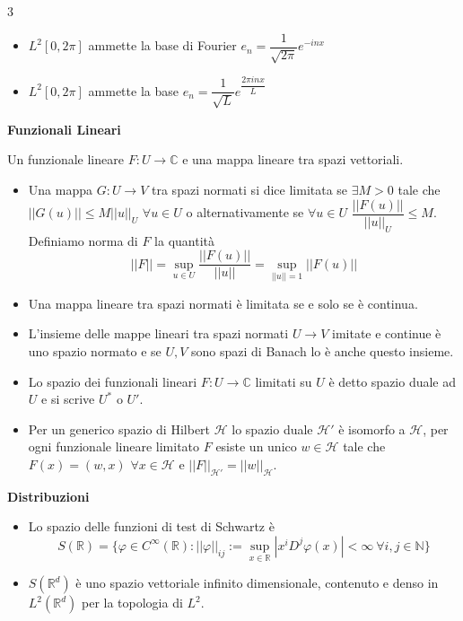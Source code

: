 \documentclass[10pt,a4paper]{report}
\begin{document}
\begin{multicols*}{3}
\begin{center}
\begin{itemize}[label=$\cdot$]
		\begin{itemize}
			\item $L^2[0,2\pi]$ ammette la base di Fourier $e_n=\dfrac{1}{\sqrt{2\pi}}e^{-inx}$
			\item $L^2[0,2\pi]$ ammette la base $e_n=\dfrac{1}{\sqrt{L}}e^{\dfrac{2\pi inx}{L}}$
		\end{itemize}
	\end{itemize}
\par
\textbf{Funzionali Lineari} \par
Un funzionale lineare $F:U\rightarrow \mathbb{C}$ e una mappa lineare tra spazi vettoriali. \par
	\begin{itemize}[label=$\cdot$]
		\item Una mappa $G:U\rightarrow V$ tra spazi normati si dice limitata se $\exists M>0$ tale che $||G(u)||\leq M ||u||_U$ $\forall u\in U$ o alternativamente se $\forall u\in U$ $\dfrac{||F(u)||}{||u||_U}\leq M$.\\ Definiamo norma di $F$ la quantità \[||F||=\sup_{u\in U}\dfrac{||F(u)||}{||u||}=\sup_{||u||=1}||F(u)||\]
		\item Una mappa lineare tra spazi normati è limitata se e solo se è continua.
		\item L'insieme delle mappe lineari tra spazi normati $U\rightarrow V$ imitate e continue è uno spazio normato e se $U,V$ sono spazi di Banach lo è anche questo insieme.
		\item Lo spazio dei funzionali lineari  $F:U\rightarrow\mathbb{C}$ limitati su $U$ è detto spazio duale ad $U$ e si scrive $U^*$ o $U'$.
		\item Per un generico spazio di Hilbert $\mathcal{H}$ lo spazio duale $\mathcal{H}'$ è isomorfo a $\mathcal{H}$, per ogni funzionale lineare limitato $F$ esiste un unico $w\in\mathcal{H}$ tale che $F(x)=(w,x)$ $\forall x\in \mathcal{H}$ e $||F||_{\mathcal{H}'}=||w||_{\mathcal{H}}$. 
	\end{itemize}
\par
\textbf{\large Distribuzioni}\par 
	\begin{itemize}[label=$\cdot$]
		\item Lo spazio delle funzioni di test di Schwartz è
\[S(\mathbb{R})=\{\varphi\in C^\infty(\mathbb{R}) : ||\varphi||_{ij}:=\sup_{x\in\mathbb{R}}|x^iD^j \varphi(x) |<\infty \>\forall i,j\in\mathbb{N}\} \]
		\item $S(\mathbb{R}^d)$ è uno spazio vettoriale infinito dimensionale, contenuto e denso in $L^2(\mathbb{R}^d)$  per la topologia di $L^2$.

\end{itemize}
\end{center}
\end{multicols*}
\end{document}
